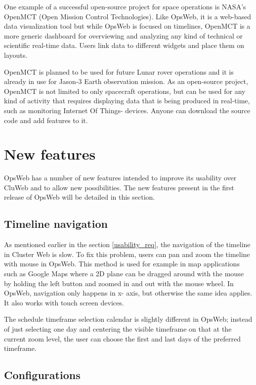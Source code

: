 One example of a successful open-source project for space operations is NASA's OpenMCT (Open Mission Control Technologies). Like OpsWeb, it is a web-based data visualization tool but while OpsWeb is focused on timelines, OpenMCT is a more generic dashboard for overviewing and analyzing any kind of technical or scientific real-time data. Users link data to different widgets and place them on layouts. 

OpenMCT is planned to be used for future Lunar rover operations and it is already in use for Jason-3 Earth observation mission. As an open-source project, OpenMCT is not limited to only spacecraft operations, but can be used for any kind of activity that requires displaying data that is being produced in real-time, such as monitoring Internet Of Things- devices. Anyone can download the source code and add features to it. \cite{trimble2014reconfigurable, trimble2016open}

\section{New features}
OpsWeb has a number of new features intended to improve its usability over CluWeb and to allow new possibilities. The new features present in the first release of OpsWeb will be detailed in this section.

\subsection{Timeline navigation}
As mentioned earlier in the section \ref{usability_req}, the navigation of the timeline in Cluster Web is slow. To fix this problem, users can pan and zoom the timeline with mouse in OpsWeb. This method is used for example in map applications such as Google Maps where a 2D plane can be dragged around with the mouse by holding the left button and zoomed in and out with the mouse wheel. In OpsWeb, navigation only happens in x- axis, but otherwise the same idea applies. It also works with touch screen devices.

The schedule timeframe selection calendar is slightly different in OpsWeb; instead of just selecting one day and centering the visible timeframe on that at the current zoom level, the user can choose the first and last days of the preferred timeframe.

\subsection{Configurations}

